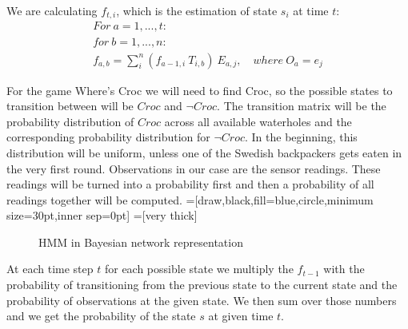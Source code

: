 \documentclass[a4paper]{article}
\begin{document}
We are calculating $f_{t,i}$, which is the estimation of state $s_{i}$ at time $t$:
\begin{align*}
For \ a=1,...,t: \\ %
for \ b=1,...,n: \\
f_{a,b} = \sum_{i}^{n}(f_{a-1,i} \ T_{i,b})\ E_{a,j}, \quad where \ O_{a}=e_{j}
\end{align*}

For the game Where's Croc we will need to find Croc, so the possible states to transition between will be $Croc$ and $\neg{Croc}$. The transition matrix will be the probability distribution of $Croc$ across all available waterholes and the corresponding probability distribution for $\neg{Croc}$. In the beginning, this distribution will be uniform, unless one of the Swedish backpackers gets eaten in the very first round. Observations in our case are the sensor readings. These readings will be turned into a probability first and then a probability of all readings together will be computed. 
\vskip 0.5cm
=[draw,black,fill=blue,circle,minimum size=30pt,inner sep=0pt]
=[very thick]
\begin{figure}
\caption{HMM in Bayesian network representation}
\end{figure}

At each time step $t$ for each possible state we multiply the $f_{t-1}$ with the probability of transitioning from the previous state to the current state and the probability of observations at the given state. We then sum over those numbers and we get the probability of the state $s$ at given time $t$.
\end{document}
